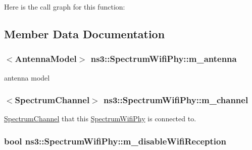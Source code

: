Here is the call graph for this function\+:




\subsection{Member Data Documentation}
\subsubsection[{\texorpdfstring{m\+\_\+antenna}{m_antenna}}]{$<${\bf Antenna\+Model}$>$ ns3\+::\+Spectrum\+Wifi\+Phy\+::m\+\_\+antenna\hspace{0.3cm}{\ttfamily [private]}}\hypertarget{classns3_1_1SpectrumWifiPhy_a54db14b60533b3c2d82f1b001eb17d6c}{}\label{classns3_1_1SpectrumWifiPhy_a54db14b60533b3c2d82f1b001eb17d6c}


antenna model 

\subsubsection[{\texorpdfstring{m\+\_\+channel}{m_channel}}]{$<${\bf Spectrum\+Channel}$>$ ns3\+::\+Spectrum\+Wifi\+Phy\+::m\+\_\+channel\hspace{0.3cm}{\ttfamily [private]}}\hypertarget{classns3_1_1SpectrumWifiPhy_a43a85d339058e0e48a1932cbf60650b0}{}\label{classns3_1_1SpectrumWifiPhy_a43a85d339058e0e48a1932cbf60650b0}


\hyperlink{classns3_1_1SpectrumChannel}{Spectrum\+Channel} that this \hyperlink{classns3_1_1SpectrumWifiPhy}{Spectrum\+Wifi\+Phy} is connected to. 

\subsubsection[{\texorpdfstring{m\+\_\+disable\+Wifi\+Reception}{m_disableWifiReception}}]{\setlength{\rightskip}{0pt plus 5cm}bool ns3\+::\+Spectrum\+Wifi\+Phy\+::m\+\_\+disable\+Wifi\+Reception\hspace{0.3cm}{\ttfamily [private]}}\hypertarget{classns3_1_1SpectrumWifiPhy_aceccd3aa8c8e75ac9c136b089a10176b}{}\label{classns3_1_1SpectrumWifiPhy_aceccd3aa8c8e75ac9c136b089a10176b}


